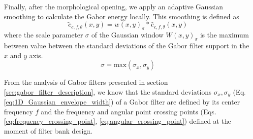 \documentclass[journal]{IEEEtran}
\newcommand{\RE}{\mathrm{Re}}
\newcommand{\IM}{\mathrm{Im}}
\begin{document}
Finally, after the morphological opening, we apply an adaptive Gaussian smoothing to calculate the Gabor energy locally. This smoothing is defined as 
\begin{equation}\label{eq:gabor_energy_smth}
	\widetilde{e}_{c, f, \theta}(x,y) = w(x, y)_\sigma\ast \widehat{e}_{c, f, \theta}(x,y)
\end{equation}
where the scale parameter $\sigma$ of the Gaussian window $W(x,y)_\sigma$ is the maximum between value between the standard deviations of the Gabor filter support in the $x$ and $y$ axis.
\begin{equation}\label{eq:gauss_sigma_smth}
	\sigma = \mathrm{max}(\sigma_x, \sigma_y)
\end{equation}

From the analysis of Gabor filters presented in section \ref{sec:gabor_filter_description}, we know that the standard deviations $\sigma_x, \sigma_y$ (Eq. \eqref{eq:1D_Gaussian_envelope_width}) of a Gabor filter are defined by its center frequency $f$ and the frequency and angular point crossing points (Eqs. \eqref{eq:frequency_crossing_point}, \eqref{eq:angular_crossing_point}) defined at the moment of filter bank design. 

%    	    
\end{document}
